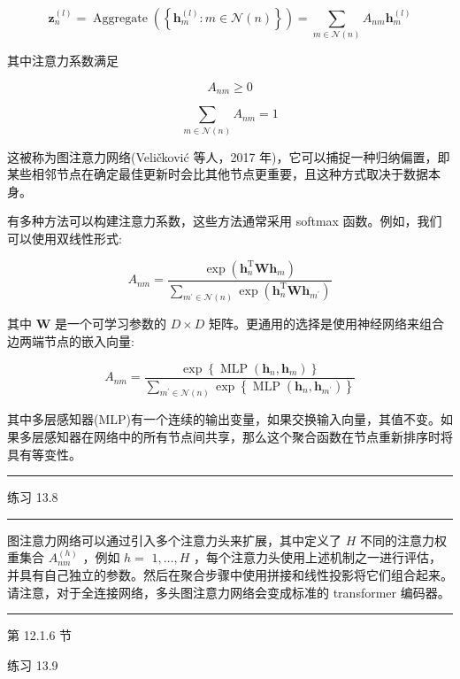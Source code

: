 \documentclass[10pt]{report}
\newcommand{\HRule}{\begin{center}\rule{0.9\linewidth}{0.2mm}\end{center}}
\begin{document}
\[
{\mathbf{z}}_{n}^{\left( l\right) } = \operatorname{Aggregate}\left( \left\{  {{\mathbf{h}}_{m}^{\left( l\right) } : m \in  \mathcal{N}\left( n\right) }\right\}  \right)  = \mathop{\sum }\limits_{{m \in  \mathcal{N}\left( n\right) }}{A}_{nm}{\mathbf{h}}_{m}^{\left( l\right) } \tag{13.24}
\]

其中注意力系数满足

\[
{A}_{nm} \geq  0 \tag{13.25}
\]

\[
\mathop{\sum }\limits_{{m \in  \mathcal{N}\left( n\right) }}{A}_{nm} = 1 \tag{13.26}
\]

这被称为图注意力网络(Veličković 等人，2017 年)，它可以捕捉一种归纳偏置，即某些相邻节点在确定最佳更新时会比其他节点更重要，且这种方式取决于数据本身。

有多种方法可以构建注意力系数，这些方法通常采用 softmax 函数。例如，我们可以使用双线性形式:

\[
{A}_{nm} = \frac{\exp \left( {{\mathbf{h}}_{n}^{\mathrm{T}}\mathbf{W}{\mathbf{h}}_{m}}\right) }{\mathop{\sum }\limits_{{{m}^{\prime } \in  \mathcal{N}\left( n\right) }}\exp \left( {{\mathbf{h}}_{n}^{\mathrm{T}}\mathbf{W}{\mathbf{h}}_{{m}^{\prime }}}\right) } \tag{13.27}
\]

其中 \(\mathbf{W}\) 是一个可学习参数的 \(D \times  D\) 矩阵。更通用的选择是使用神经网络来组合边两端节点的嵌入向量:

\[
{A}_{nm} = \frac{\exp \left\{  {\operatorname{MLP}\left( {{\mathbf{h}}_{n},{\mathbf{h}}_{m}}\right) }\right\}  }{\mathop{\sum }\limits_{{{m}^{\prime } \in  \mathcal{N}\left( n\right) }}\exp \left\{  {\operatorname{MLP}\left( {{\mathbf{h}}_{n},{\mathbf{h}}_{{m}^{\prime }}}\right) }\right\}  } \tag{13.28}
\]

其中多层感知器(MLP)有一个连续的输出变量，如果交换输入向量，其值不变。如果多层感知器在网络中的所有节点间共享，那么这个聚合函数在节点重新排序时将具有等变性。

\HRule

练习 13.8

\HRule

图注意力网络可以通过引入多个注意力头来扩展，其中定义了 \(H\) 不同的注意力权重集合 \({A}_{nm}^{\left( h\right) }\) ，例如 \(h =\)  \(1,\ldots ,H\) ，每个注意力头使用上述机制之一进行评估，并具有自己独立的参数。然后在聚合步骤中使用拼接和线性投影将它们组合起来。请注意，对于全连接网络，多头图注意力网络会变成标准的 transformer 编码器。

\HRule

第 12.1.6 节

练习 13.9
\end{document}
